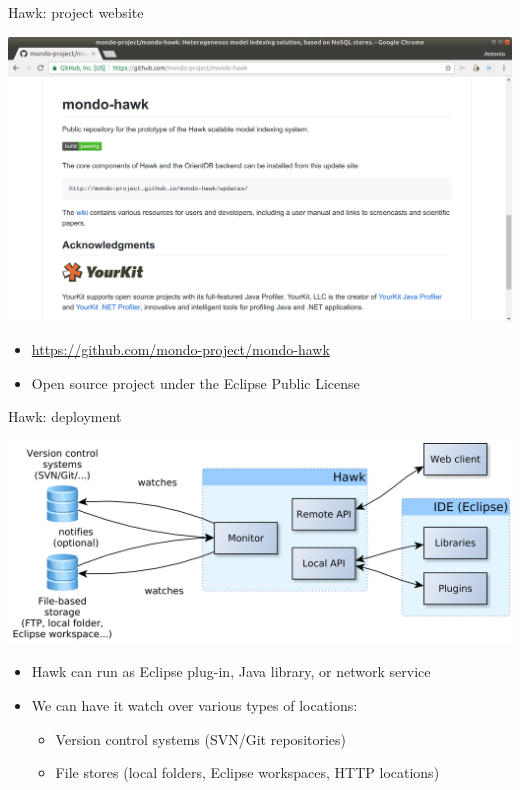 \documentclass[10pt]{beamer}
\begin{document}
\begin{frame}{Hawk: project website}
  \begin{center}
    \includegraphics[width=\textwidth]{hawk-github}
  \end{center}

  \begin{itemize}
  \item \url{https://github.com/mondo-project/mondo-hawk}
  \item Open source project under the Eclipse Public License
  \end{itemize}
\end{frame}

\begin{frame}{Hawk: deployment}

  \begin{center}
    \includegraphics[width=\textwidth]{hawk-deployment}
  \end{center}

  \begin{itemize}
  \item Hawk can run as Eclipse plug-in, Java library, or network service
  \item We can have it watch over various types of locations:
    \begin{itemize}
    \item Version control systems (SVN/Git repositories)
    \item File stores (local folders, Eclipse workspaces, HTTP locations)
    \end{itemize}
  \end{itemize}

\end{frame}
\end{document}
